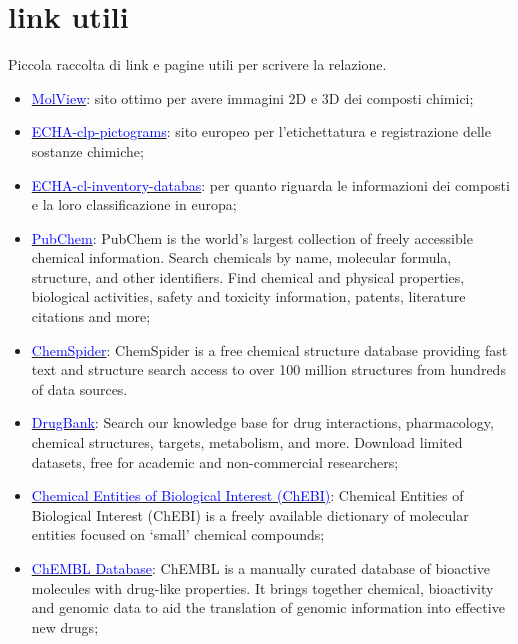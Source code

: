 \section*{link utili}

Piccola raccolta di link e pagine utili per scrivere la relazione.
\begin{footnotesize}
\begin{multicols}{2}
\begin{itemize}
    \item \href{https://molview.org/}{\textcolor{blue}{MolView}}: sito ottimo per avere immagini 2D e 3D dei composti chimici;
    \item \href{https://echa.europa.eu/it/regulations/clp/clp-pictograms}{\textcolor{blue}{ECHA-clp-pictograms}}: sito europeo per l'etichettatura e registrazione delle sostanze chimiche;
    \item \href{https://echa.europa.eu/it/information-on-chemicals/cl-inventory-database}{\textcolor{blue}{ECHA-cl-inventory-databas}}: per quanto riguarda le informazioni dei composti e la loro classificazione in europa;
    \item \href{https://pubchem.ncbi.nlm.nih.gov/}{\textcolor{blue}{PubChem}}: PubChem is the world's largest collection of freely accessible chemical information. Search chemicals by name, molecular formula, structure, and other identifiers. Find chemical and physical properties, biological activities, safety and toxicity information, patents, literature citations and more;
    \item \href{http://www.chemspider.com/}{\textcolor{blue}{ChemSpider}}: ChemSpider is a free chemical structure database providing fast text and structure search access to over 100 million structures from hundreds of data sources.
    \item \href{https://go.drugbank.com/}{\textcolor{blue}{DrugBank}}: Search our knowledge base for drug interactions, pharmacology, chemical structures, targets, metabolism, and more. Download limited datasets, free for academic and non-commercial researchers;
    \item \href{https://www.ebi.ac.uk/chebi/init.do}{\textcolor{blue}{Chemical Entities of Biological Interest (ChEBI)}}: Chemical Entities of Biological Interest (ChEBI) is a freely available dictionary of molecular entities focused on ‘small’ chemical compounds;
    \item \href{https://www.ebi.ac.uk/chembl/}{\textcolor{blue}{ChEMBL Database}}: ChEMBL is a manually curated database of bioactive molecules with drug-like properties. It brings together chemical, bioactivity and genomic data to aid the translation of genomic information into effective new drugs;

\end{itemize}
\end{multicols}
\end{footnotesize}
